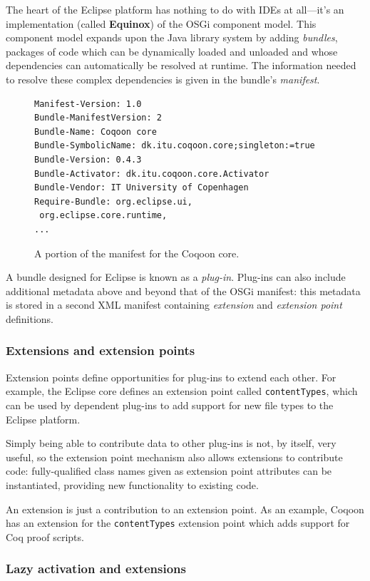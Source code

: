 \documentclass{article}
\newcommand{\fdef}[1]{\textit{#1}}
\newcommand{\name}[1]{\textbf{#1}}
\begin{document}
The heart of the Eclipse platform has nothing to do with IDEs at all---it's an
implementation (called \name{Equinox}) of the OSGi component model. This
component model expands upon the Java library system by adding \fdef{bundles},
packages of code which can be dynamically loaded and unloaded and whose
dependencies can automatically be resolved at runtime. The information needed
to resolve these complex dependencies is given in the bundle's \fdef{manifest}.

\begin{figure}[h]
\begin{lstlisting}[basicstyle=\footnotesize\ttfamily]
Manifest-Version: 1.0
Bundle-ManifestVersion: 2
Bundle-Name: Coqoon core
Bundle-SymbolicName: dk.itu.coqoon.core;singleton:=true
Bundle-Version: 0.4.3
Bundle-Activator: dk.itu.coqoon.core.Activator
Bundle-Vendor: IT University of Copenhagen
Require-Bundle: org.eclipse.ui,
 org.eclipse.core.runtime,
...
\end{lstlisting}
\caption{A portion of the manifest for the Coqoon core.}
\end{figure}

A bundle designed for Eclipse is known as a \fdef{plug-in}. Plug-ins can also
include additional metadata above and beyond that of the OSGi manifest: this
metadata is stored in a second XML manifest containing \fdef{extension} and
\fdef{extension point} definitions.

\subsubsection{Extensions and extension points}

Extension points define opportunities for plug-ins to extend each other. For
example, the Eclipse core defines an extension point called
\texttt{contentTypes}, which can be used by dependent plug-ins to add support
for new file types to the Eclipse platform.

Simply being able to contribute data to other plug-ins is not, by itself, very
useful, so the extension point mechanism also allows extensions to contribute
code: fully-qualified class names given as extension point attributes can be
instantiated, providing new functionality to existing code.

An extension is just a contribution to an extension point. As an example,
Coqoon has an extension for the \texttt{contentTypes} extension point which
adds support for Coq proof scripts.

\subsubsection{Lazy activation and extensions}
\end{document}
